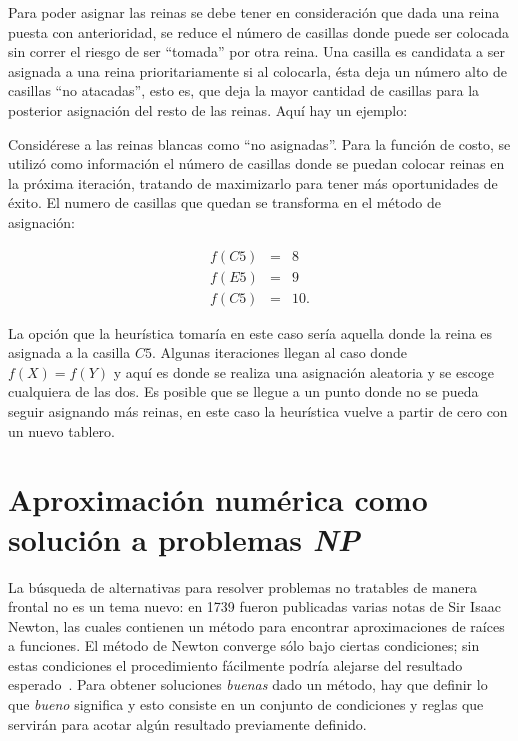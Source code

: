 Para poder asignar las reinas se debe tener en consideración que dada una reina
puesta con anterioridad, se reduce el número de casillas donde puede ser colocada
sin correr el riesgo de ser ``tomada'' por otra reina. Una casilla es candidata
a ser asignada a una reina prioritariamente si al colocarla, ésta deja un número
alto de casillas ``no atacadas'', esto es, que deja la mayor cantidad de
casillas para la posterior asignación del resto de las reinas. Aquí hay un
ejemplo:



Considérese a las reinas blancas como ``no asignadas''. Para la función de
costo, se utilizó como información el número de casillas donde se puedan colocar
reinas en la próxima iteración, tratando de maximizarlo para tener más
oportunidades de éxito. El numero de casillas que quedan se transforma en
el método de asignación:

\begin{displaymath}
  \begin{array}{rcl}
    f(C5) & = & 8 \\
    f(E5) & = & 9 \\
    f(C5) & = & 10.
  \end{array}
\end{displaymath}

La opción que la heurística tomaría en este caso sería aquella donde la reina
es asignada a la casilla $C5$. Algunas iteraciones llegan al caso donde
$f(X) = f(Y)$ y aquí es donde se realiza una asignación aleatoria y se escoge
cualquiera de las dos. Es posible que se llegue a un punto donde no se pueda
seguir asignando más reinas, en este caso la heurística vuelve a partir de cero
con un nuevo tablero.



\section{Aproximación numérica como solución a problemas \textsl{NP}}

La búsqueda de alternativas para resolver problemas no tratables de manera
frontal no es un tema nuevo: en 1739 fueron publicadas varias notas de Sir
Isaac Newton, las cuales contienen un método para encontrar aproximaciones de
raíces a funciones. El método de Newton converge sólo bajo ciertas condiciones;
sin estas condiciones el procedimiento fácilmente podría alejarse del resultado
esperado~\cite{newton}. Para obtener soluciones \textit{buenas} dado un método,
hay que definir lo que \textit{bueno} significa y esto consiste en un conjunto
de condiciones y reglas que servirán para acotar algún resultado previamente
definido.

